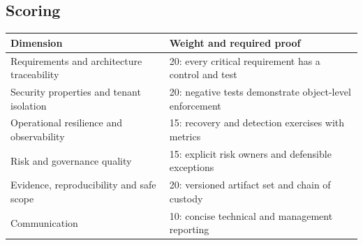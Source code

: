 \documentclass[10pt,letterpaper,oneside]{article}
\begin{document}
\subsection{Scoring}
\par\medskip\noindent\begin{tabularx}{\textwidth}{@{}p{}X@{}}\toprule
Dimension & Weight and required proof \\ \midrule
Requirements and architecture traceability & 20: every critical requirement has a control and test\\
Security properties and tenant isolation & 20: negative tests demonstrate object-level enforcement\\
Operational resilience and observability & 15: recovery and detection exercises with metrics\\
Risk and governance quality & 15: explicit risk owners and defensible exceptions\\
Evidence, reproducibility and safe scope & 20: versioned artifact set and chain of custody\\
Communication & 10: concise technical and management reporting\\
\bottomrule\end{tabularx}\par\medskip
\end{document}
